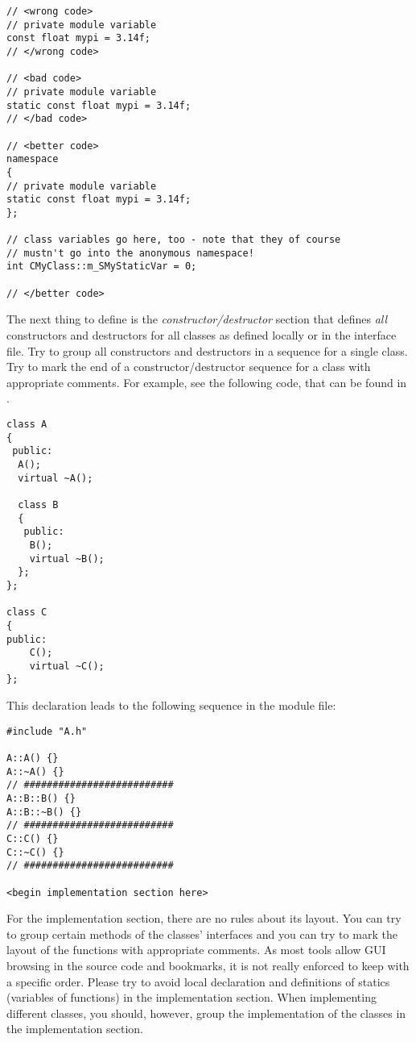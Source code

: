 \begin{verbatim}
// <wrong code>
// private module variable
const float mypi = 3.14f;
// </wrong code>

// <bad code>
// private module variable
static const float mypi = 3.14f;
// </bad code>

// <better code>
namespace
{
// private module variable
static const float mypi = 3.14f;
};

// class variables go here, too - note that they of course
// mustn't go into the anonymous namespace!
int CMyClass::m_SMyStaticVar = 0;

// </better code>
\end{verbatim}


The next thing to define is the \emph{constructor/destructor} section that defines \emph{all} constructors and destructors for all classes as defined locally or in the interface file.
Try to group all constructors and destructors in a sequence for a single class.
Try to mark the end of a constructor/destructor sequence for a class with appropriate comments.
For example, see the following code, that can be found in .
\begin{verbatim}
class A
{
 public:
  A();
  virtual ~A();
  
  class B
  {
   public:
    B();
    virtual ~B();
  };
}; 

class C
{
public:
	C();
	virtual ~C();
};
\end{verbatim}
This declaration leads to the following sequence in the module file:
\begin{verbatim}
#include "A.h"

A::A() {}
A::~A() {}
// ##########################
A::B::B() {}
A::B::~B() {}
// ##########################
C::C() {}
C::~C() {}
// ##########################

<begin implementation section here>
\end{verbatim}

For the implementation section, there are no rules about its layout.
You can try to group certain methods of the classes' interfaces and you can try to mark the layout of the functions with appropriate comments.
As most tools allow GUI browsing in the source code and bookmarks, it is not really enforced to keep with a specific order.
Please try to avoid local declaration and definitions of statics (variables of functions) in the implementation section.
When implementing different classes, you should, however, group the implementation of the classes in the implementation section.

